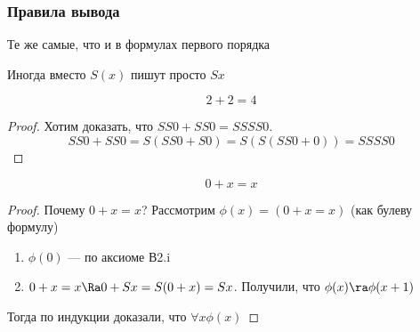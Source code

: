 \subsubsection{Правила вывода}
Те же самые, что и в формулах первого порядка

Иногда вместо \(S(x)\) пишут просто \(Sx\)

\begin{proposition}
    \[2 + 2 = 4\]
\end{proposition}
\begin{proof}
    Хотим доказать, что \(SS0 + SS0 = SSSS0\).
    \[SS0 + SS0 = S(SS0 + S0) = S(S(SS0 + 0)) = SSSS0\]
\end{proof}

\begin{proposition}
    \[0 + x = x\]
\end{proposition}
\begin{proof}
    Почему \(0 + x = x\)? Рассмотрим \(\phi(x) = (0 + x = x)\) (как булеву формулу)
    \begin{enumerate}
        \item \(\phi(0)\) --- по аксиоме В2.i
        \item \(0 + x = x \Ra 0 + Sx = S(0 + x) = Sx\). Получили, что \(\phi(x) \ra \phi(x + 1)\)
    \end{enumerate}
    Тогда по индукции доказали, что \(\forall x \phi(x)\)
\end{proof}
